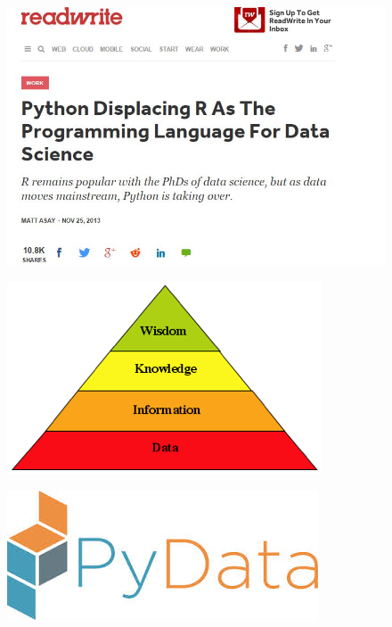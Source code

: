 \documentclass[MASTER.tex]{subfiles}
\begin{document}
 
\begin{frame}
\begin{figure}
\centering
\includegraphics[width=1.05\linewidth]{mjasay}

\end{figure}

\end{frame}
\begin{frame}
	\begin{figure}
\centering
\includegraphics[width=0.9\linewidth]{KnowledgePyramid}

\end{figure}

\end{frame}
		\begin{frame}
		\begin{figure}
\centering
\includegraphics[width=1.05\linewidth]{pydatalogo}

\end{figure}

	\end{frame}
\end{document}
